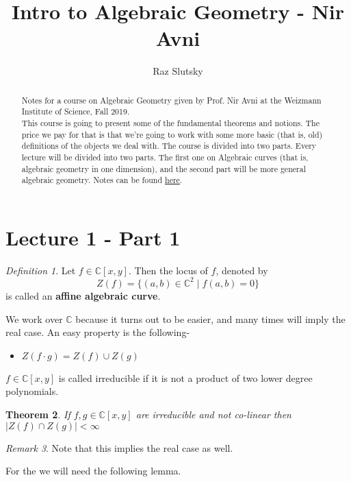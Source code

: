 \documentclass[12pt]{article}
\title{Intro to Algebraic Geometry - Nir Avni}
\author{Raz Slutsky}
\date{}
\newtheorem{theorem}{Theorem}[section]
\theoremstyle{remark}
\newtheorem{remark}[theorem]{Remark}
\newtheorem{definition}[theorem]{Definition}
\newcommand{\C}{\mathbb{C}}
\begin{document}
\maketitle

\begin{abstract}
Notes for a course on Algebraic Geometry given by Prof. Nir Avni at the Weizmann Institute of Science, Fall 2019. \\ 
This course is going to present some of the fundamental theorems and notions. The price we pay for that is that we're going to work with some more basic (that is, old) definitions of the objects we deal with. The course is divided into two parts. Every lecture will be divided into two parts. The first one on Algebraic curves (that is, algebraic geometry in one dimension), and the second part will be more general algebraic geometry. Notes can be found \href{github.com/theavnis/AGcourse}{here}.
\end{abstract}




\section{Lecture 1 - Part 1}
\begin{definition}
Let $f \in \C[x,y]$. Then the locus of $f$, denoted by $$Z(f) =\{ (a,b) \in \C^2 \; | \; f(a,b) = 0 \}$$ is called an \textbf{affine algebraic curve}.
\end{definition}

We work over $\C$ because it turns out to be easier, and many times will imply the real case. An easy property is the following-

\begin{itemize}
\item $Z(f \cdot g) = Z(f) \cup Z(g)$

\end{itemize}

$f \in \C[x,y]$ is called irreducible if it is not a product of two lower degree polynomials.

\begin{theorem}
If $f,g \in \C[x,y]$ are irreducible and not co-linear then $|Z(f) \cap Z(g)| < \infty$
\end{theorem}

\begin{remark}
Note that this implies the real case as well.
\end{remark}

For the we will need the following lemma.
\end{document}
